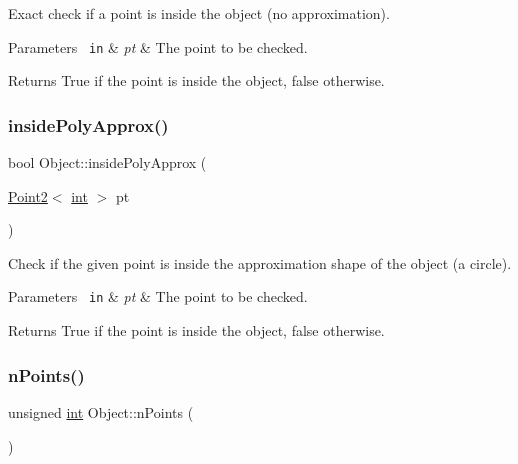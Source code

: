 Exact check if a point is inside the object (no approximation). 


\begin{DoxyParams}[1]{Parameters}
\mbox{\texttt{ in}}  & {\em pt} & The point to be checked. \\
\hline
\end{DoxyParams}
\begin{DoxyReturn}{Returns}
True if the point is inside the object, false otherwise. 
\end{DoxyReturn}
\mbox{\label{class_object_a5dd7d9cd5bd29176b04ab10d7577fc56}} 
\subsubsection{\texorpdfstring{insidePolyApprox()}{insidePolyApprox()}}
{\footnotesize\ttfamily bool Object\+::inside\+Poly\+Approx (\begin{DoxyParamCaption}\item[{\mbox{\hyperlink{class_point2}{Point2}}$<$ \mbox{\hyperlink{draw_8hh_aa620a13339ac3a1177c86edc549fda9b}{int}} $>$}]{pt }\end{DoxyParamCaption})}



Check if the given point is inside the approximation shape of the object (a circle). 


\begin{DoxyParams}[1]{Parameters}
\mbox{\texttt{ in}}  & {\em pt} & The point to be checked. \\
\hline
\end{DoxyParams}
\begin{DoxyReturn}{Returns}
True if the point is inside the object, false otherwise. 
\end{DoxyReturn}
\mbox{\label{class_object_a27b5515d2b0b695a0a402d8bbda3a4fa}} 
\subsubsection{\texorpdfstring{nPoints()}{nPoints()}}
{\footnotesize\ttfamily unsigned \mbox{\hyperlink{draw_8hh_aa620a13339ac3a1177c86edc549fda9b}{int}} Object\+::n\+Points (\begin{DoxyParamCaption}{ }\end{DoxyParamCaption})}



